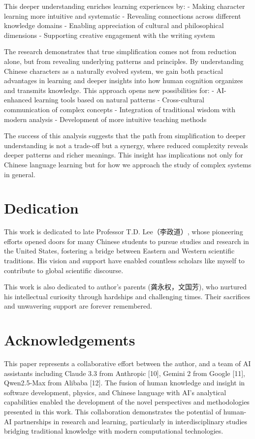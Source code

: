\documentclass[11pt,letterpaper]{article}
\begin{document}
This deeper understanding enriches learning experiences by: - Making
character learning more intuitive and systematic - Revealing connections
across different knowledge domains - Enabling appreciation of cultural
and philosophical dimensions - Supporting creative engagement with the
writing system

The research demonstrates that true simplification comes not from
reduction alone, but from revealing underlying patterns and principles.
By understanding Chinese characters as a naturally evolved system, we
gain both practical advantages in learning and deeper insights into how
human cognition organizes and transmits knowledge. This approach opens
new possibilities for: - AI-enhanced learning tools based on natural
patterns - Cross-cultural communication of complex concepts -
Integration of traditional wisdom with modern analysis - Development of
more intuitive teaching methods

The success of this analysis suggests that the path from simplification
to deeper understanding is not a trade-off but a synergy, where reduced
complexity reveals deeper patterns and richer meanings. This insight has
implications not only for Chinese language learning but for how we
approach the study of complex systems in general.

\section{Dedication}\label{dedication}

This work is dedicated to late Professor T.D. Lee（李政道）, whose
pioneering efforts opened doors for many Chinese students to pursue
studies and research in the United States, fostering a bridge between
Eastern and Western scientific traditions. His vision and support have
enabled countless scholars like myself to contribute to global
scientific discourse.

This work is also dedicated to author's parents (龚永权，文国芳), who
nurtured his intellectual curiosity through hardships and challenging
times. Their sacrifices and unwavering support are forever remembered.

\section{Acknowledgements}\label{acknowledgements}

This paper represents a collaborative effort between the author, and a
team of AI assistants including Claude 3.3 from Anthropic {[}10{]},
Gemini 2 from Google {[}11{]}, Qwen2.5-Max from Alibaba {[}12{]}. The
fusion of human knowledge and insight in software development, physics,
and Chinese language with AI's analytical capabilities enabled the
development of the novel perspectives and methodologies presented in
this work. This collaboration demonstrates the potential of human-AI
partnerships in research and learning, particularly in interdisciplinary
studies bridging traditional knowledge with modern computational
technologies.
\end{document}
